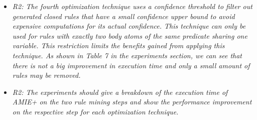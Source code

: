 \begin{figure*}[t!]
\hspace{.1\textwidth}
\begin{minipage}{.8\textwidth}
\large 
\begin{itemize}
      
      \item \textit{R2: The fourth optimization technique uses a confidence threshold to filter out generated closed rules that have a 
      small confidence upper bound to avoid expensive computations for its actual confidence. 
      This technique can only be used for rules with exactly two body atoms of the same predicate sharing one variable. 
      This restriction limits the benefits gained from applying this technique. 
      As shown in Table 7 in the experiments section, we can see that there is not a big improvement in execution time and only a small amount of rules may be removed.\\  }

      
      
      \item \textit{R2: The experiments should give a breakdown of the execution time of AMIE+ on the two rule mining steps and show the performance improvement on the respective step for each optimization technique.\\  }
      

\end{itemize}
\end{minipage}
\end{figure*}
